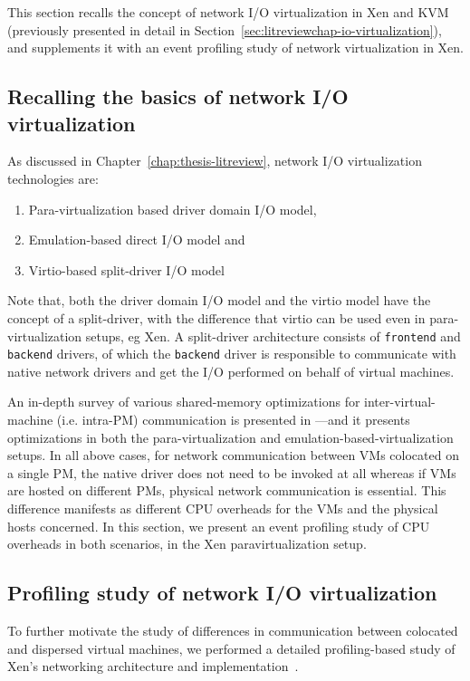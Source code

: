 This section recalls the concept of network I/O
virtualization in Xen and KVM 
(previously presented in detail in
Section~\ref{sec:litreviewchap-io-virtualization}), and supplements it
with an event profiling study of network virtualization in Xen.

\subsection{Recalling the basics of network I/O virtualization}
As discussed in Chapter~\ref{chap:thesis-litreview}, network I/O 
virtualization technologies are:
\begin{enumerate}
\item Para-virtualization based driver domain I/O model,
\item Emulation-based direct I/O model and
\item Virtio-based split-driver I/O model
\end{enumerate}
Note that, both the driver domain I/O model and the virtio model 
have the concept of a split-driver, with the difference
that virtio can be used even in para-virtualization setups, eg Xen.
A split-driver architecture consists of
\texttt{frontend} and \texttt{backend} drivers, of which the 
\texttt{backend} driver is responsible to communicate with 
native network drivers and get the I/O performed on behalf of 
virtual machines. 

An in-depth survey of various shared-memory optimizations
for inter-virtual-machine (i.e. intra-PM) communication
is presented in \cite{shared-mem-optimizations}---and it
presents optimizations in both the para-virtualization
and emulation-based-virtualization setups.
In all above cases, for network communication between VMs 
colocated on a single PM, the native driver 
does not need to be invoked at all whereas
if VMs are hosted on different PMs, physical network
communication is essential. 
This difference manifests as different
CPU overheads for the VMs and the physical hosts 
concerned. In this section, 
we present an event profiling study of CPU overheads in both scenarios,
in the Xen paravirtualization setup.

\subsection{Profiling study of network I/O virtualization}
To further motivate the study of differences in communication between
colocated and dispersed virtual machines, we performed a detailed 
profiling-based study of Xen's 
networking architecture and 
implementation~\cite{xen-internals, xen-networking, linux-networking}. 


